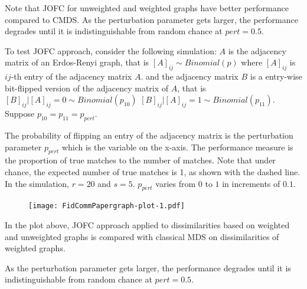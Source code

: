 \documentclass[12pt,oneside,final]{thesis}\usepackage[]{graphicx}\usepackage[]{color}
\begin{document}
Note that JOFC for unweighted and weighted graphs  have better performance compared to CMDS. As the perturbation parameter gets larger, the performance degrades until it is indistinguishable from random chance at $pert=0.5$.

 
  To test JOFC approach, consider the following simulation: $A$ is the adjacency matrix of an Erdos-Renyi graph, that is
  $\left[A\right]_{ij} \sim Binomial(p)$ where $\left[A\right]_{ij}$ is $ij$-th entry of the adjacency matrix  $A$.
   and the adjacency matrix  $B$ is a entry-wise bit-flipped version of the adjacency matrix of $A$, that is
    $\left[B\right]_{ij}|\left[A\right]_{ij}=0 \sim Binomial(p_{10})$ $\left[B\right]_{ij}|\left[A\right]_{ij}=1 \sim Binomial(p_{11})$. Suppose $p_{10}=p_{11}=p_{pert}$.
  
  The probability of flipping an entry of the adjacency matrix is the perturbation parameter $p_{pert}$ which is the variable on the x-axis. 
  The performance measure is the proportion of true matches to the number of matches. Note that 
  under chance, the expected number of true matches is 1, as shown with the dashed line. In the simulation, $r=20$ and $s=5$. $p_{pert}$ varies from $0$ to $1$ in increments of $0.1$. 
\begin{figure}
  \texttt{[image: FidCommPapergraph-plot-1.pdf]}
\end{figure}


In the plot above, JOFC approach applied to  dissimilarities based on weighted and unweighted graphs is compared with classical MDS on dissimilarities of weighted graphs.

As the perturbation parameter gets larger, the performance degrades until it is indistinguishable from random chance at $pert=0.5$.
\end{document}
